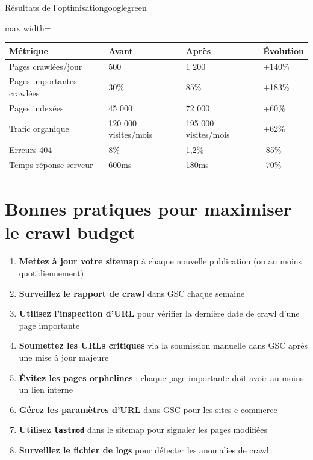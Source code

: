 \documentclass[12pt,a4paper,twoside]{report}
\begin{document}
\begin{mybox}{Résultats de l'optimisation}{googlegreen}
\begin{adjustbox}{max width=\textwidth}
\begin{tabular}{|p{5cm}|p{3cm}|p{3cm}|p{3cm}|}
\hline
\textbf{Métrique} & \textbf{Avant} & \textbf{Après} & \textbf{Évolution} \\
\hline
Pages crawlées/jour & 500 & 1 200 & +140\% \\
\hline
Pages importantes crawlées & 30\% & 85\% & +183\% \\
\hline
Pages indexées & 45 000 & 72 000 & +60\% \\
\hline
Trafic organique & 120 000 visites/mois & 195 000 visites/mois & +62\% \\
\hline
Erreurs 404 & 8\% & 1,2\% & -85\% \\
\hline
Temps réponse serveur & 600ms & 180ms & -70\% \\
\hline
\end{tabular}
\end{adjustbox}
\end{mybox}

\section{Bonnes pratiques pour maximiser le crawl budget}

\begin{enumerate}
    \item \textbf{Mettez à jour votre sitemap} à chaque nouvelle publication (ou au moins quotidiennement)
    \item \textbf{Surveillez le rapport de crawl} dans GSC chaque semaine
    \item \textbf{Utilisez l'inspection d'URL} pour vérifier la dernière date de crawl d'une page importante
    \item \textbf{Soumettez les URLs critiques} via la soumission manuelle dans GSC après une mise à jour majeure
    \item \textbf{Évitez les pages orphelines} : chaque page importante doit avoir au moins un lien interne
    \item \textbf{Gérez les paramètres d'URL} dans GSC pour les sites e-commerce
    \item \textbf{Utilisez \texttt{lastmod}} dans le sitemap pour signaler les pages modifiées
    \item \textbf{Surveillez le fichier de logs} pour détecter les anomalies de crawl
\end{enumerate}
\end{document}

